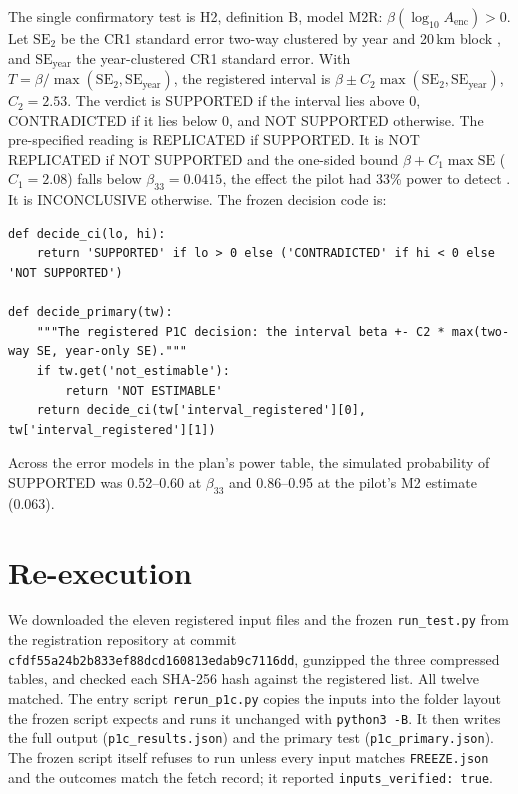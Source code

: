 \documentclass[11pt]{article}
\begin{document}
The single confirmatory test is H2, definition B, model M2R: $\beta(\log_{10}A_{\text{enc}})>0$. Let $\mathrm{SE}_2$ be the CR1 standard error
two-way clustered by year and 20\,km block \citep{Cameron2011}, and $\mathrm{SE}_{\text{year}}$ the year-clustered CR1 standard error.
With $T=\beta/\max(\mathrm{SE}_2,\mathrm{SE}_{\text{year}})$, the registered interval is $\beta\pm C_2\max(\mathrm{SE}_2,\mathrm{SE}_{\text{year}})$,
$C_2=2.53$. The verdict is SUPPORTED if the interval lies above 0, CONTRADICTED if it lies below 0, and NOT SUPPORTED otherwise. The pre-specified reading is
REPLICATED if SUPPORTED. It is NOT REPLICATED if NOT SUPPORTED and the one-sided bound $\beta+C_1\max\mathrm{SE}$ ($C_1=2.08$) falls below
$\beta_{33}=0.0415$, the effect the pilot had 33\% power to detect \citep{Simonsohn2015}. It is INCONCLUSIVE otherwise.
The frozen decision code is:
\begin{lstlisting}
def decide_ci(lo, hi):
    return 'SUPPORTED' if lo > 0 else ('CONTRADICTED' if hi < 0 else 'NOT SUPPORTED')

def decide_primary(tw):
    """The registered P1C decision: the interval beta +- C2 * max(two-way SE, year-only SE)."""
    if tw.get('not_estimable'):
        return 'NOT ESTIMABLE'
    return decide_ci(tw['interval_registered'][0], tw['interval_registered'][1])
\end{lstlisting}
Across the error models in the plan's power table, the simulated probability of SUPPORTED was 0.52--0.60 at $\beta_{33}$ and 0.86--0.95 at the pilot's M2 estimate (0.063).

\section{Re-execution}
We downloaded the eleven registered input files and the frozen \texttt{run\_test.py} from the registration repository at commit
\texttt{cfdf55a24b2b833ef88dcd160813edab9c7116dd}, gunzipped the three compressed tables, and checked each SHA-256 hash against the registered list.
All twelve matched. The entry script \texttt{rerun\_p1c.py} copies the inputs into the folder layout the frozen script expects and runs it
unchanged with \texttt{python3 -B}. It then writes the full output (\texttt{p1c\_results.json}) and the primary test
(\texttt{p1c\_primary.json}). The frozen script itself refuses to run unless every input matches \texttt{FREEZE.json} and the outcomes match the
fetch record; it reported \texttt{inputs\_verified: true}.
\end{document}
